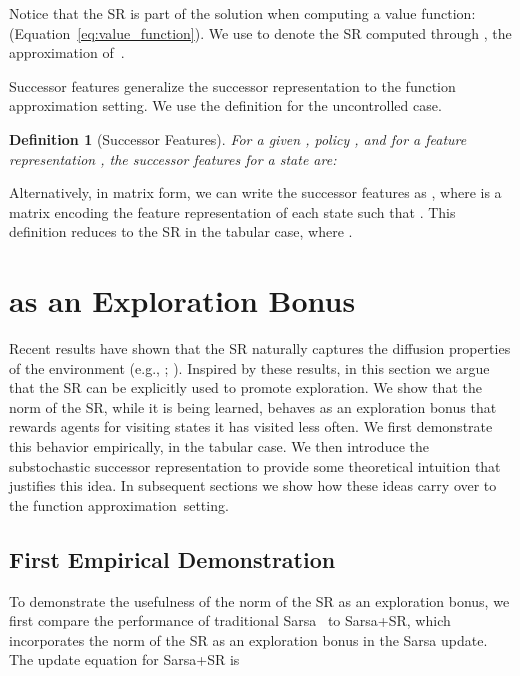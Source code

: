 \documentclass[letterpaper]{article} \usepackage{aaai20}  \usepackage{times}  \usepackage{helvet} \usepackage{courier}  \usepackage[hyphens]{url}  \usepackage{graphicx} \urlstyle{rm} \def\UrlFont{\rm}  \usepackage{graphicx}  \frenchspacing  \setlength{\pdfpagewidth}{8.5in}  \setlength{\pdfpageheight}{11in}  \usepackage{booktabs}
\newtheorem{definition}{Definition}[section]
\begin{document}
Notice that the SR is part of the solution when computing a value function:  (Equation~\ref{eq:value_function}). We use  to denote the SR computed through , the approximation of~.

Successor features \cite{Barreto17} generalize the successor representation to the function approximation setting. We use the definition for the uncontrolled case.

\begin{definition}[Successor Features] For a given , policy , and for a feature representation , the successor features for a state  are:

\label{def:sf}
\end{definition}

Alternatively, in matrix form, we can write the successor features as , where  is a matrix encoding the feature representation of each state such that . This definition reduces to the SR in the tabular case, where .

\section{ as an Exploration Bonus}
\label{sec:theory}

Recent results have shown that the SR naturally captures the diffusion properties of the environment (e.g., \citeauthor{Machado18b} \citeyear{Machado18b}; \citeauthor{Wu19} \citeyear{Wu19}). Inspired by these results, in this section we argue that the SR can be explicitly used to promote exploration. We show that the norm of the SR, while it is being learned, behaves as an exploration bonus that rewards agents for visiting states it has visited less often. We first demonstrate this behavior empirically, in the tabular case. We then introduce the substochastic successor representation to provide some theoretical intuition that justifies this idea. In subsequent sections we show how these ideas carry over to the function approximation~setting.

\subsection{First Empirical Demonstration}\label{sec:model_free_tabular}

To demonstrate the usefulness of the norm of the SR as an exploration bonus, we first compare the performance of traditional Sarsa~\cite{Rummery94,Sutton98} to Sarsa+SR, which incorporates the norm of the SR as an exploration bonus in the Sarsa update. The update equation for Sarsa+SR is
\end{document}
